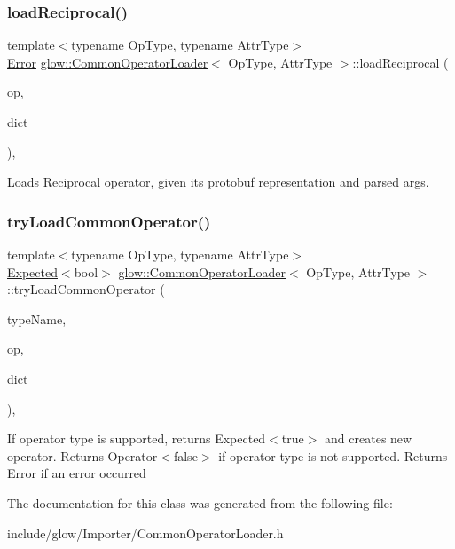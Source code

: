 \subsubsection{\texorpdfstring{load\+Reciprocal()}{loadReciprocal()}}
{\footnotesize\ttfamily template$<$typename Op\+Type, typename Attr\+Type$>$ \\
\hyperlink{namespaceglow_afdb176c3a672ef66db0ecfc19a8d39bf}{Error} \hyperlink{classglow_1_1_common_operator_loader}{glow\+::\+Common\+Operator\+Loader}$<$ Op\+Type, Attr\+Type $>$\+::load\+Reciprocal (\begin{DoxyParamCaption}\item[{const Op\+Type \&}]{op,  }\item[{Argument\+Dictionary\+Ty \&}]{dict }\end{DoxyParamCaption})\hspace{0.3cm}{\ttfamily [inline]}, {\ttfamily [protected]}}

Loads Reciprocal operator, given its protobuf representation and parsed args. \mbox{\label{classglow_1_1_common_operator_loader_aa499c4f1138c06c9954bd10a74d59fce}} 
\subsubsection{\texorpdfstring{try\+Load\+Common\+Operator()}{tryLoadCommonOperator()}}
{\footnotesize\ttfamily template$<$typename Op\+Type, typename Attr\+Type$>$ \\
\hyperlink{classglow_1_1detail_1_1_glow_expected}{Expected}$<$bool$>$ \hyperlink{classglow_1_1_common_operator_loader}{glow\+::\+Common\+Operator\+Loader}$<$ Op\+Type, Attr\+Type $>$\+::try\+Load\+Common\+Operator (\begin{DoxyParamCaption}\item[{llvm\+::\+String\+Ref}]{type\+Name,  }\item[{const Op\+Type \&}]{op,  }\item[{Argument\+Dictionary\+Ty \&}]{dict }\end{DoxyParamCaption})\hspace{0.3cm}{\ttfamily [inline]}, {\ttfamily [protected]}}

If operator type is supported, returns Expected$<$true$>$ and creates new operator. Returns Operator$<$false$>$ if operator type is not supported. Returns Error if an error occurred 

The documentation for this class was generated from the following file\+:\begin{DoxyCompactItemize}
\item 
include/glow/\+Importer/Common\+Operator\+Loader.\+h\end{DoxyCompactItemize}
